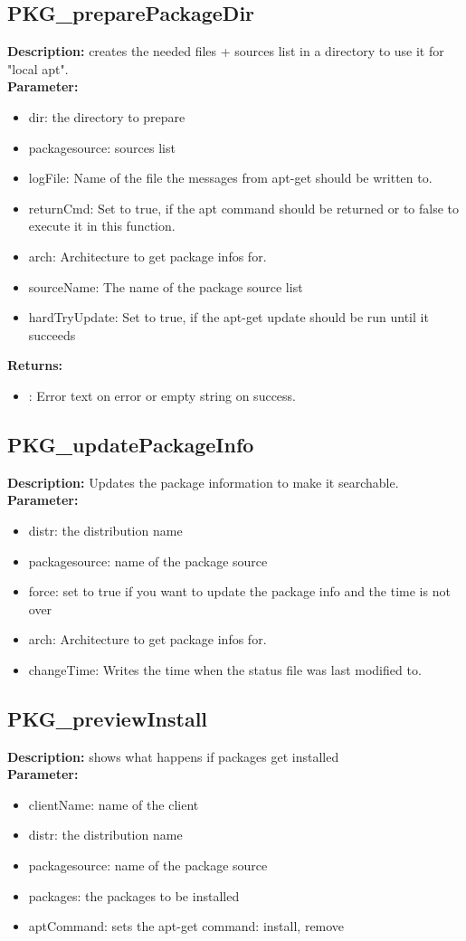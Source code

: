 \subsection{PKG\_preparePackageDir}
\textbf{Description:} creates the needed files + sources list in a directory to use it for "local apt".\\
\textbf{Parameter:}
\begin{itemize}
\item dir: the directory to prepare
\item packagesource: sources list
\item logFile: Name of the file the messages from apt-get should be written to.
\item returnCmd: Set to true, if the apt command should be returned or to false to execute it in this function.
\item arch: Architecture to get package infos for.
\item sourceName: The name of the package source list
\item hardTryUpdate: Set to true, if the apt-get update should be run until it succeeds
\end{itemize}
\textbf{Returns:}
\begin{itemize}
\item : Error text on error or empty string on success.
\end{itemize}

\subsection{PKG\_updatePackageInfo}
\textbf{Description:} Updates the package information to make it searchable.\\
\textbf{Parameter:}
\begin{itemize}
\item distr: the distribution name
\item packagesource: name of the package source
\item force: set to true if you want to update the package info and the time is not over
\item arch: Architecture to get package infos for.
\item changeTime: Writes the time when the status file was last modified to.
\end{itemize}

\subsection{PKG\_previewInstall}
\textbf{Description:} shows what happens if packages get installed\\
\textbf{Parameter:}
\begin{itemize}
\item clientName: name of the client
\item distr: the distribution name
\item packagesource: name of the package source
\item packages: the packages to be installed
\item aptCommand: sets the apt-get command: install, remove
\end{itemize}


